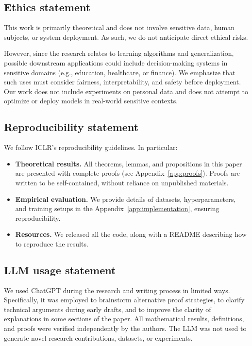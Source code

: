 \documentclass[dvipsnames]{article} %
\begin{document}
\newpage
\subsection*{Ethics statement}

This work is primarily theoretical and does not involve sensitive data, human subjects, or system deployment. As such, we do not anticipate direct ethical risks.

However, since the research relates to learning algorithms and generalization, possible downstream applications could include decision-making systems in sensitive domains (e.g., education, healthcare, or finance). We emphasize that such uses must consider fairness, interpretability, and safety before deployment. Our work does not include experiments on personal data and does not attempt to optimize or deploy models in real-world sensitive contexts.

\subsection*{Reproducibility statement}

We follow ICLR’s reproducibility guidelines. In particular:
\begin{itemize}
    \item \textbf{Theoretical results.} All theorems, lemmas, and propositions in this paper are presented with complete proofs (see Appendix~\ref{app:proofs}). Proofs are written to be self-contained, without reliance on unpublished materials.
    \item \textbf{Empirical evaluation.} We provide details of datasets, hyperparameters, and training setups in the Appendix~\ref{app:implementation}, ensuring reproducibility.
    \item \textbf{Resources.} We released all the code, along with a README describing how to reproduce the results.
\end{itemize}

\subsection*{LLM usage statement} 

We used ChatGPT during the research and writing process in limited ways. Specifically, it was employed to brainstorm alternative proof strategies, to clarify technical arguments during early drafts, and to improve the clarity of explanations in some sections of the paper. All mathematical results, definitions, and proofs were verified independently by the authors. The LLM was not used to generate novel research contributions, datasets, or experiments.
\end{document}
